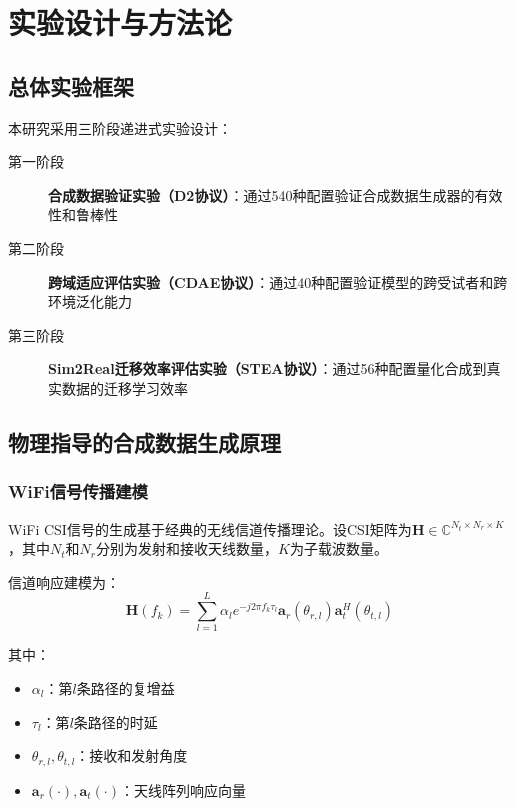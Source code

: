 \section{实验设计与方法论}
\label{sec:methodology}

\subsection{总体实验框架}
\label{subsec:framework}

本研究采用三阶段递进式实验设计：

\begin{description}
\item[第一阶段] \textbf{合成数据验证实验（D2协议）}：通过540种配置验证合成数据生成器的有效性和鲁棒性
\item[第二阶段] \textbf{跨域适应评估实验（CDAE协议）}：通过40种配置验证模型的跨受试者和跨环境泛化能力
\item[第三阶段] \textbf{Sim2Real迁移效率评估实验（STEA协议）}：通过56种配置量化合成到真实数据的迁移学习效率
\end{description}

\subsection{物理指导的合成数据生成原理}
\label{subsec:physics_principles}

\subsubsection{WiFi信号传播建模}
WiFi CSI信号的生成基于经典的无线信道传播理论。设CSI矩阵为$\mathbf{H} \in \mathbb{C}^{N_t \times N_r \times K}$，其中$N_t$和$N_r$分别为发射和接收天线数量，$K$为子载波数量。

信道响应建模为：
\begin{equation}
\mathbf{H}(f_k) = \sum_{l=1}^{L} \alpha_l e^{-j2\pi f_k \tau_l} \mathbf{a}_r(\theta_{r,l}) \mathbf{a}_t^H(\theta_{t,l})
\label{eq:channel_model}
\end{equation}

其中：
\begin{itemize}
\item $\alpha_l$：第$l$条路径的复增益
\item $\tau_l$：第$l$条路径的时延
\item $\theta_{r,l}, \theta_{t,l}$：接收和发射角度
\item $\mathbf{a}_r(\cdot), \mathbf{a}_t(\cdot)$：天线阵列响应向量
\end{itemize}

